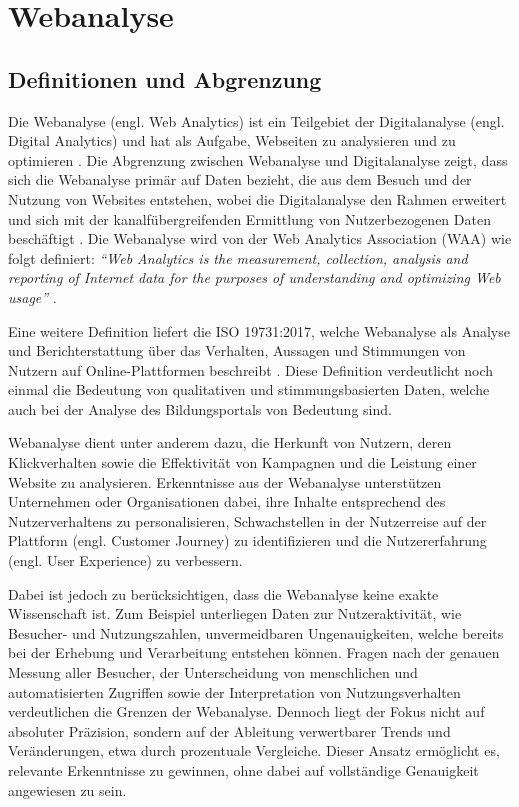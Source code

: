 \chapter{Webanalyse} %
\label{ch:webanalyse} 

\section{Definitionen und Abgrenzung} %
\label{sec:definitionabgrenzung}
Die Webanalyse (engl. Web Analytics) ist ein Teilgebiet der Digitalanalyse (engl. Digital Analytics) und hat als Aufgabe, Webseiten zu analysieren und zu optimieren \parencite[Kap.1.2]{Hassler2019}. Die Abgrenzung zwischen Webanalyse und Digitalanalyse zeigt, dass sich die Webanalyse primär auf Daten bezieht, die aus dem Besuch und der Nutzung von Websites entstehen, wobei die Digitalanalyse den Rahmen erweitert und sich mit der kanalfübergreifenden Ermittlung von Nutzerbezogenen Daten beschäftigt \parencite[Kap.1.2]{Hassler2019}. Die Webanalyse wird von der Web Analytics Association (WAA) wie folgt definiert: \textit{``Web Analytics is the measurement, collection, analysis and reporting of Internet data for the purposes of understanding and optimizing Web usage''} \parencite[3]{WAA2008}.

Eine weitere Definition liefert die ISO 19731:2017, welche Webanalyse als Analyse und Berichterstattung über das Verhalten, Aussagen und Stimmungen von Nutzern auf Online-Plattformen beschreibt \parencite[Kap.3.40]{ISO2017}. Diese Definition verdeutlicht noch einmal die Bedeutung von qualitativen und stimmungsbasierten Daten, welche auch bei der Analyse des Bildungsportals von Bedeutung sind.

Webanalyse dient unter anderem dazu, die Herkunft von Nutzern, deren Klickverhalten sowie die Effektivität von Kampagnen und die Leistung einer Website zu analysieren. Erkenntnisse aus der Webanalyse unterstützen Unternehmen oder Organisationen dabei, ihre Inhalte entsprechend des Nutzerverhaltens zu personalisieren, Schwachstellen in der Nutzerreise auf der Plattform (engl. Customer Journey) zu identifizieren und die Nutzererfahrung (engl. User Experience) zu verbessern. \parencite{PiwikProWebanalyse}

Dabei ist jedoch zu berücksichtigen, dass die Webanalyse keine exakte Wissenschaft ist. Zum Beispiel unterliegen Daten zur Nutzeraktivität, wie Besucher- und Nutzungszahlen, unvermeidbaren Ungenauigkeiten, welche bereits bei der Erhebung und Verarbeitung entstehen können. Fragen nach der genauen Messung aller Besucher, der Unterscheidung von menschlichen und automatisierten Zugriffen sowie der Interpretation von Nutzungsverhalten verdeutlichen die Grenzen der Webanalyse. Dennoch liegt der Fokus nicht auf absoluter Präzision, sondern auf der Ableitung verwertbarer Trends und Veränderungen, etwa durch prozentuale Vergleiche. Dieser Ansatz ermöglicht es, relevante Erkenntnisse zu gewinnen, ohne dabei auf vollständige Genauigkeit angewiesen zu sein. \parencite[Kap.1.4]{Hassler2019}

